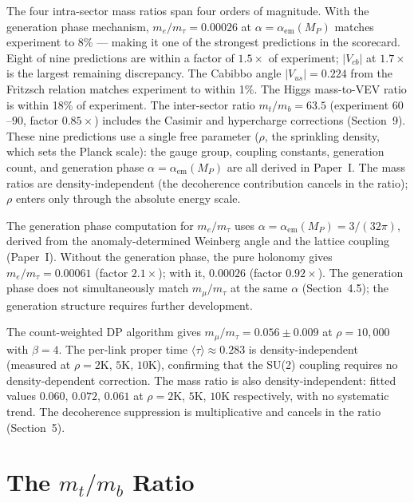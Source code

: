 \documentclass[11pt,letterpaper]{article}
\begin{document}
The four intra-sector mass ratios span four orders of
magnitude.  With the generation phase mechanism,
$m_e/m_\tau = 0.00026$ at $\alpha = \alpha_{\mathrm{em}}(M_P)$
matches experiment to 8\% --- making it one of the strongest
predictions in the scorecard.  Eight of nine predictions are within a
factor of $1.5\times$ of experiment; $|V_{cb}|$ at $1.7\times$ is
the largest remaining discrepancy.
The Cabibbo angle $|V_{us}| = 0.224$ from the Fritzsch relation
matches experiment to within 1\%.
The Higgs mass-to-VEV ratio is within 18\% of experiment.
The inter-sector ratio $m_t/m_b = 63.5$ (experiment $60$--$90$,
factor $0.85\times$) includes the Casimir and hypercharge corrections
(Section~9).
These nine
predictions use a single free parameter ($\rho$, the sprinkling
density, which sets the Planck scale): the gauge group, coupling
constants, generation count, and generation phase $\alpha =
\alpha_{\mathrm{em}}(M_P)$ are all derived in Paper~I.  The mass
ratios are density-independent (the decoherence contribution
cancels in the ratio); $\rho$ enters only through the absolute
energy scale.

\medskip
\noindent The generation phase computation for $m_e/m_\tau$ uses
$\alpha = \alpha_{\mathrm{em}}(M_P) = 3/(32\pi)$, derived from the
anomaly-determined Weinberg angle and the lattice coupling (Paper~I).
Without the generation phase, the pure holonomy gives $m_e/m_\tau =
0.00061$ (factor $2.1\times$); with it, $0.00026$ (factor
$0.92\times$).  The generation phase does not simultaneously match
$m_\mu/m_\tau$ at the same $\alpha$ (Section~4.5); the generation
structure requires further development.

The count-weighted DP algorithm gives $m_\mu/m_\tau = 0.056 \pm
0.009$ at $\rho = 10{,}000$ with $\beta = 4$.  The per-link proper
time $\langle\tau\rangle \approx 0.283$ is density-independent
(measured at $\rho = 2$K, $5$K, $10$K), confirming that the SU(2)
coupling requires no density-dependent correction.  The mass ratio
is also density-independent: fitted values $0.060$, $0.072$, $0.061$
at $\rho = 2$K, $5$K, $10$K respectively, with no systematic trend.
The decoherence suppression is multiplicative and cancels in the
ratio (Section~5).

\section{The $m_t/m_b$ Ratio}
\end{document}
